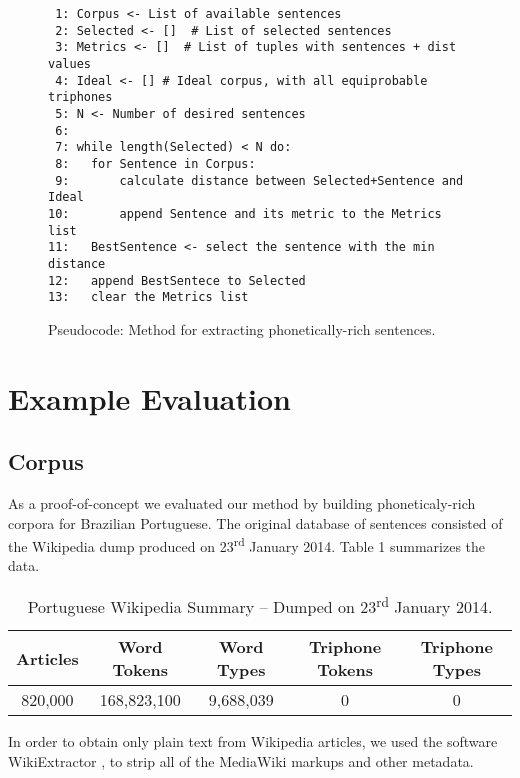 \begin{figure}
\scriptsize
\caption{Pseudocode: Method for extracting phonetically-rich sentences.}\label{fig:phon-rich-pseudocode}
\begin{lstlisting}
 1: Corpus <- List of available sentences
 2: Selected <- []  # List of selected sentences
 3: Metrics <- []  # List of tuples with sentences + dist values
 4: Ideal <- [] # Ideal corpus, with all equiprobable triphones
 5: N <- Number of desired sentences
 6: 
 7: while length(Selected) < N do:
 8:   for Sentence in Corpus:
 9:       calculate distance between Selected+Sentence and Ideal
10:       append Sentence and its metric to the Metrics list
11:   BestSentence <- select the sentence with the min distance
12:   append BestSentece to Selected
13:   clear the Metrics list
\end{lstlisting}
\end{figure}


\section{Example Evaluation}
\subsection{Corpus}

As a proof-of-concept we evaluated our method by building phoneticaly-rich corpora for Brazilian Portuguese. The original 
database of sentences consisted of the Wikipedia dump produced on 23\textsuperscript{rd} January 2014.
Table 1 summarizes the data.

\begin{table}[!ht]
\begin{center}
\begin{tabular}{|c|c|c|c|c|}
\hline \bf Articles & \bf Word Tokens  & \bf Word Types & \bf Triphone Tokens & \bf Triphone Types\\\hline
820,000 & 168,823,100 & 9,688,039 & 0 & 0\\
\hline
\end{tabular}
\end{center}
\caption{\label{wikipedia-summary} Portuguese Wikipedia Summary -- Dumped on 23\textsuperscript{rd} January 2014.}
\end{table}

In order to obtain only plain text from Wikipedia articles, we used the software WikiExtractor \cite{Wikiextractor2013}, to strip 
all of the MediaWiki markups and other metadata. 

